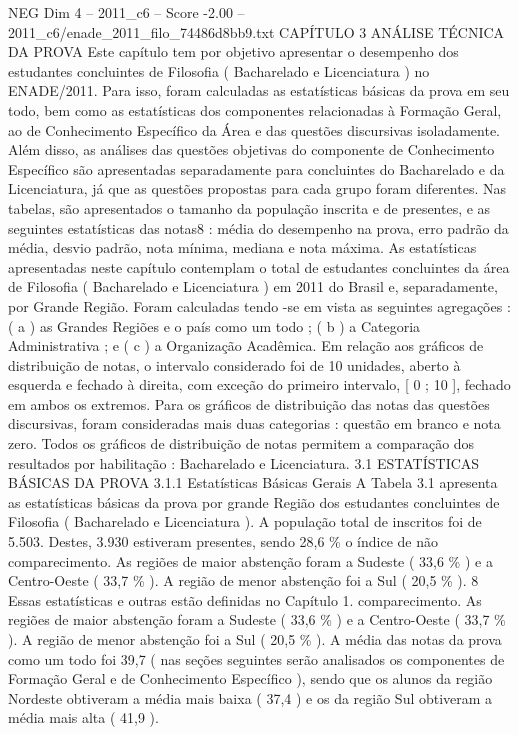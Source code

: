 \begin{textsample}{NEG Dim 4 – 2011\_c6 – Score -2.00 – 2011\_c6/enade\_2011\_filo\_74486d8bb9.txt}  \label{ex:f4_neg_059}
CAPÍTULO 3 ANÁLISE TÉCNICA DA PROVA Este capítulo tem por objetivo apresentar o desempenho dos estudantes concluintes de Filosofia ( Bacharelado e Licenciatura ) no ENADE/2011.
Para isso, foram calculadas as estatísticas básicas da prova em seu todo, bem como as estatísticas dos componentes relacionadas à Formação Geral, ao de Conhecimento Específico da Área e das questões discursivas isoladamente.
Além disso, as análises das questões objetivas do componente de Conhecimento Específico são apresentadas separadamente para concluintes do Bacharelado e da Licenciatura, já que as questões propostas para cada grupo foram diferentes.
Nas tabelas, são apresentados o tamanho da população inscrita e de presentes, e as seguintes estatísticas das notas8 : média do desempenho na prova, erro padrão da média, desvio padrão, nota mínima, mediana e nota máxima.
As estatísticas apresentadas neste capítulo contemplam o total de estudantes concluintes da área de Filosofia ( Bacharelado e Licenciatura ) em 2011 do Brasil e, separadamente, por Grande Região.
Foram calculadas tendo -se em vista as seguintes agregações : ( a ) as Grandes Regiões e o país como um todo ; ( b ) a Categoria Administrativa ; e ( c ) a Organização Acadêmica.
Em relação aos gráficos de distribuição de notas, o intervalo considerado foi de 10 unidades, aberto à esquerda e fechado à direita, com exceção do primeiro intervalo, [ 0 ; 10 ], fechado em ambos os extremos.
Para os gráficos de distribuição das notas das questões discursivas, foram consideradas mais duas categorias : questão em branco e nota zero.
Todos os gráficos de distribuição de notas permitem a comparação dos resultados por habilitação : Bacharelado e Licenciatura. 3.1 ESTATÍSTICAS BÁSICAS DA PROVA 3.1.1 Estatísticas Básicas Gerais A Tabela 3.1 apresenta as estatísticas básicas da prova por grande Região dos estudantes concluintes de Filosofia ( Bacharelado e Licenciatura ).
A população total de inscritos foi de 5.503.
Destes, 3.930 estiveram presentes, sendo 28,6 \% o índice de não comparecimento.
As regiões de maior abstenção foram a Sudeste ( 33,6 \% ) e a Centro-Oeste ( 33,7 \% ).
A região de menor abstenção foi a Sul ( 20,5 \% ). 8 Essas estatísticas e outras estão definidas no Capítulo 1. comparecimento.
As regiões de maior abstenção foram a Sudeste ( 33,6 \% ) e a Centro-Oeste ( 33,7 \% ).
A região de menor abstenção foi a Sul ( 20,5 \% ).
A média das notas da prova como um todo foi 39,7 ( nas seções seguintes serão analisados os componentes de Formação Geral e de Conhecimento Específico ), sendo que os alunos da região Nordeste obtiveram a média mais baixa ( 37,4 ) e os da região Sul obtiveram a média mais alta ( 41,9 ).

\end{textsample}
